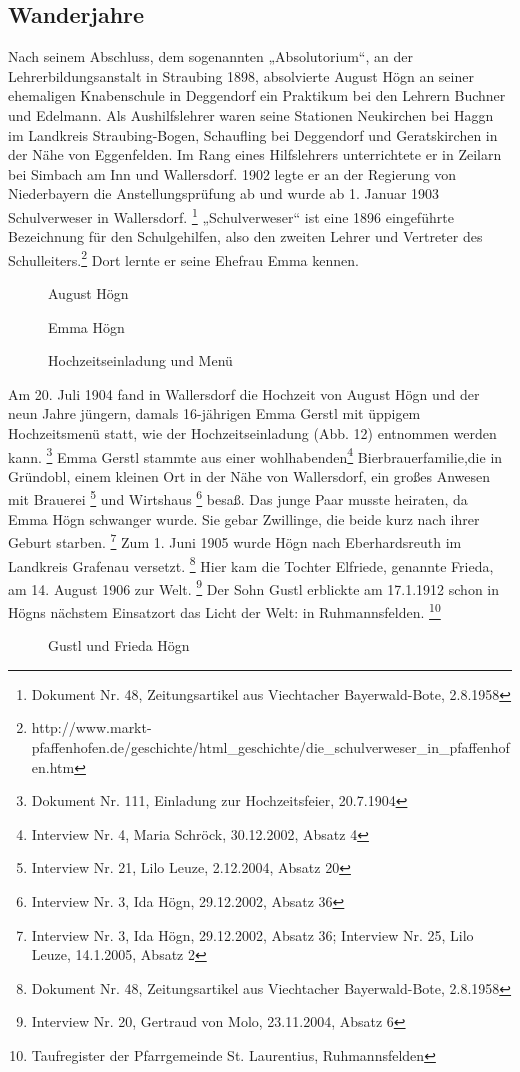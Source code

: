 \subsection{Wanderjahre}

\hypertarget{RefHeadingToc100333728}{}Nach seinem Abschluss, dem
sogenannten „Absolutorium“, an der Lehrerbildungsanstalt in Straubing
1898, absolvierte August Högn an seiner ehemaligen Knabenschule in
Deggendorf ein Praktikum bei den Lehrern Buchner und Edelmann. Als
Aushilfslehrer waren seine Stationen Neukirchen bei Haggn im Landkreis
Straubing-Bogen, Schaufling bei Deggendorf und Geratskirchen in der
Nähe von Eggenfelden. Im Rang eines Hilfslehrers unterrichtete er in
Zeilarn bei Simbach am Inn und Wallersdorf. 1902 legte er an der
Regierung von Niederbayern die Anstellungsprüfung ab und wurde ab 1.
Januar 1903 Schulverweser in Wallersdorf. \footnote{Dokument Nr. 48,
Zeitungsartikel aus Viechtacher Bayerwald-Bote, 2.8.1958}
„Schulverweser“ ist eine 1896 eingeführte Bezeichnung für den
Schulgehilfen, also den zweiten Lehrer und Vertreter des
Schulleiters.\footnote{
http://www.markt-pfaffenhofen.de/geschichte/html\_geschichte/die\_schulverweser\_in\_pfaffenhofen.htm}
Dort lernte er seine Ehefrau Emma kennen.

\begin{figure}
\caption{August Högn}
\end{figure}

\begin{figure}
\caption{Emma Högn}
\end{figure}

\begin{figure}
\caption{Hochzeitseinladung und Menü}
\end{figure}

Am 20. Juli 1904 fand in Wallersdorf die Hochzeit von August Högn und
der neun Jahre jüngern, damals 16-jährigen Emma Gerstl mit üppigem
Hochzeitsmenü statt, wie der Hochzeitseinladung (Abb. 12) entnommen
werden kann. \footnote{Dokument Nr. 111, Einladung zur Hochzeitsfeier,
20.7.1904} Emma Gerstl stammte aus einer wohlhabenden\footnote{
Interview Nr. 4, Maria Schröck, 30.12.2002, Absatz 4}
Bierbrauerfamilie,die in Gründobl, einem
kleinen Ort in der Nähe von Wallersdorf, ein großes Anwesen mit
Brauerei \footnote{Interview Nr. 21, Lilo Leuze, 2.12.2004, Absatz 20}
und Wirtshaus \footnote{Interview Nr. 3, Ida Högn, 29.12.2002, Absatz
36} besaß. Das junge Paar musste heiraten, da Emma Högn schwanger
wurde. Sie gebar Zwillinge, die beide kurz nach ihrer Geburt
starben. \footnote{Interview Nr. 3, Ida Högn, 29.12.2002, Absatz 36;
Interview Nr. 25, Lilo Leuze, 14.1.2005, Absatz 2} Zum 1. Juni 1905
wurde Högn nach Eberhardsreuth im Landkreis Grafenau
versetzt. \footnote{Dokument Nr. 48, Zeitungsartikel aus Viechtacher
Bayerwald-Bote, 2.8.1958} Hier kam die Tochter Elfriede, genannte
Frieda, am 14. August 1906 zur Welt. \footnote{Interview Nr. 20,
Gertraud von Molo, 23.11.2004, Absatz 6} Der Sohn Gustl erblickte am
17.1.1912 schon in Högns nächstem Einsatzort das Licht der Welt: in
Ruhmannsfelden. \footnote{Taufregister der Pfarrgemeinde St.
Laurentius, Ruhmannsfelden}

\begin{figure}
\caption{Gustl und Frieda Högn}
\end{figure}
